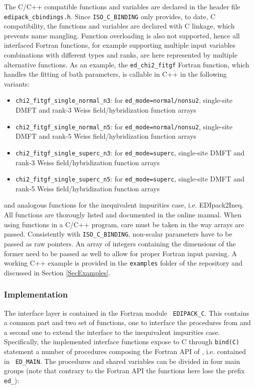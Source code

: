 \documentclass[edipack_sp.tex]{subfiles}
\begin{document}
The C/C++ compatible functions and variables 
are declared in the header file {\tt e\-di\-pack\_c\-bin\-din\-gs.h}.
Since {\tt ISO\_C\_BINDING} only provides, to date, C compatibility, the 
functions and variables are declared with C linkage, which prevents name mangling.
Function overloading is also not supported, hence all interfaced Fortran functions, for example supporting multiple input variables combinations with different types and ranks, are here represented by multiple alternative functions.
As an example, the {\tt ed\_chi2\_fitgf} Fortran function, which handles the fitting of bath parameters, is callable in C++ in the following variants:
\begin{itemize}
    \item  {\tt chi2\_fitgf\_single\_normal\_n3}: for {\tt ed\_mode=normal/nonsu2}, single-site DMFT and rank-3 Weiss field/hybridization function arrays
    \item  {\tt chi2\_fitgf\_single\_normal\_n5}: for {\tt ed\_mode=normal/nonsu2}, single-site DMFT and rank-5 Weiss field/hybridization function arrays
    \item  {\tt chi2\_fitgf\_single\_superc\_n3}: for {\tt ed\_mode=superc}, single-site DMFT and rank-3 Weiss field/hybridization function arrays
    \item  {\tt chi2\_fitgf\_single\_superc\_n5}: for {\tt ed\_mode=superc}, single-site DMFT and rank-5 Weiss field/hybridization function arrays
\end{itemize}
and analogous functions for the inequivalent impurities case, i.e. EDIpack2Ineq. All functions are thorougly listed and documented in the online manual.
When using \NAME functions in a C/C++ program, care must be taken in the way arrays are passed. Consistently with {\tt ISO\_C\_BINDING}, non-scalar parameters have to be passed as raw pointers. An array of integers containing the dimensions of the former need to be passed as well to allow for proper Fortran input parsing. A working C++ example is provided in the {\tt examples} folder of the \NAME repository and discussed in Section \ref{SecExamples}.

\subsubsection{Implementation}\label{sSecInteropCbindingsImplementation}
The interface layer is contained in the Fortran module {\tt
  EDIPACK\_C}. This contains a common part and two set of functions,
one to interface the procedures from \NAME and a second
one to extend the interface to the inequivalent impurities case.
Specifically, the implemented interface functions expose to C through
{\tt bind(C)} statement a number of
procedures composing the Fortran API of \NAME, i.e. contained in {\tt
  ED\_MAIN}. The procedures and shared variables can be divided in four main groups (note that contrary to the Fortran API the functions here lose the prefix {\tt ed\_}):
\end{document}
